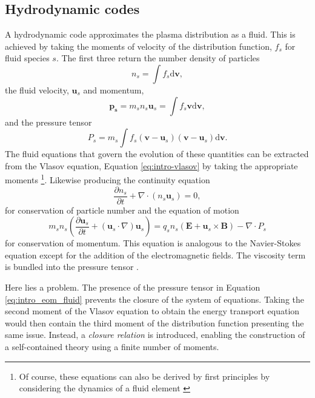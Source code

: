 \subsection{Hydrodynamic codes}
A hydrodynamic code approximates the plasma distribution as a fluid. This is achieved by taking the moments of velocity of the distribution function, $f_s$ for fluid species $s$. The first three return the number density of particles
\begin{equation}
	n_s = \int f_s \mathrm{d}\mathbf{v},
\end{equation}
the fluid velocity, $\mathbf{u}_s$ and momentum,
\begin{equation}
	\mathbf{p_s} = m_sn_s\mathbf{u}_s = \int f_s \mathbf{v}\mathrm{d}\mathbf{v},
\end{equation}
and the pressure tensor
\begin{equation}
	P_s = m_s\int f_s (\mathbf{v}-\mathbf{u}_s)(\mathbf{v}-\mathbf{u}_s)\mathrm{d}\mathbf{v}.
\end{equation}
The fluid equations that govern the evolution of these quantities can be extracted from the Vlasov equation, Equation \ref{eq:intro-vlasov} by taking the appropriate moments \footnote{Of course, these equations can also be derived by first principles by considering the dynamics of a fluid element \cite{chenIntroductionPlasmaPhysics2016}}. Likewise  producing the continuity equation
\begin{equation}
	\frac{\partial n_s}{\partial t} + \nabla \cdot (n_s \mathbf{u}_s) = 0,
\end{equation}
for conservation of particle number and the equation of motion
\begin{equation}\label{eq:intro_eom_fluid}
	m_sn_s\left(\frac{\partial \mathbf{u}_s}{\partial t} + (\mathbf{u}_s\cdot \nabla) \mathbf{u}_s \right) = q_sn_s(\mathbf{E}+\mathbf{u}_s \times \mathbf{B}) - \nabla \cdot P_s
\end{equation}
for conservation of momentum. This equation is analogous to the Navier-Stokes equation except for the addition of the electromagnetic fields. The viscosity term is bundled into the pressure tensor \cite{chenIntroductionPlasmaPhysics2016}.

Here lies a problem. The presence of the pressure tensor in Equation \ref{eq:intro_eom_fluid} prevents the closure of the system of equations. Taking the second moment of the Vlasov equation to obtain the energy transport equation would then contain the third moment of the distribution function presenting the same issue. Instead, a \textit{closure relation} is introduced, enabling the construction of a self-contained theory using a finite number of moments.

